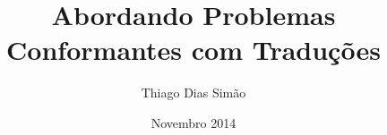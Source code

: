 \title{Abordando Problemas Conformantes com Traduções}

\author{Thiago Dias Simão }

% 
% 
\date[LIAMF 2014]{Novembro 2014}


% 
% 
